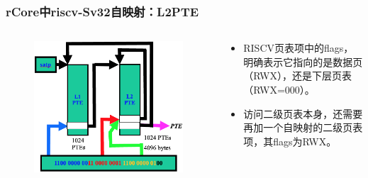 \begin{frame}
    \frametitle{rCore中riscv-Sv32自映射：L2PTE}

    \begin{columns}
    \begin{column}{0.6\textwidth}
        \begin{figure}
        \includegraphics[width=0.85\linewidth]{lecture07/figs/RV-L2-self-mapping.png}
        \end{figure}
    \end{column} \pause
    \begin{column}{0.4\textwidth}
        \begin{itemize}
            \item RISCV页表项中的flags，明确表示它指向的是数据页（RWX），还是下层页表（RWX=000）。
            \item 访问二级页表本身，还需要再加一个自映射的二级页表项，其flags为RWX。
        \end{itemize}
    \end{column}
    \end{columns}

\end{frame}

